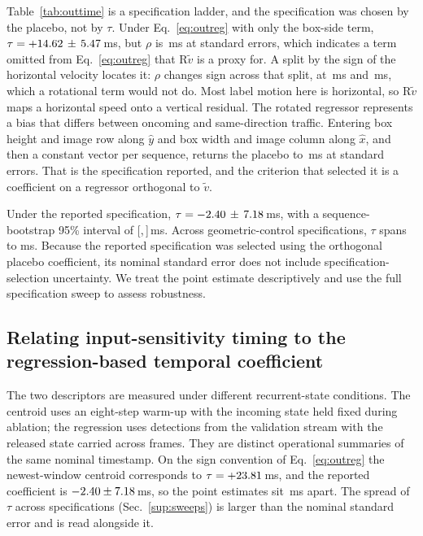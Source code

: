 \documentclass[10pt,twocolumn,letterpaper]{article}
\begin{document}
Table~\ref{tab:outtime} is a specification ladder, and the specification was
chosen by the placebo, not by $\tau$. Under Eq.~\ref{eq:outreg} with only
the box-side term, $\tau=+14.62\,\pm\,5.47$\,ms, but $\rho$ is
\ladderMinPl\,ms at \ladderMinPlSigmas{} standard errors, which indicates a term
omitted from Eq.~\ref{eq:outreg} that $\mathrm{R}\tilde v$ is a proxy for. A split by
the sign of the horizontal velocity locates it: $\rho$ changes sign across that
split, at \plRight\,ms and \plLeft\,ms, which a rotational term would not do.
Most label motion here is horizontal, so $\mathrm{R}\tilde v$ maps a horizontal speed
onto a vertical residual. The rotated regressor represents a bias that differs
between oncoming and same-direction traffic. Entering
box height and image row along $\hat{y}$ and box width and image column along
$\hat{x}$, and then a constant vector per sequence, returns the placebo to
\ladderFullPl\,ms at \ladderFullPlSigmas{} standard errors. That is the
specification reported, and the criterion that selected it is a coefficient on a
regressor orthogonal to $\tilde v$.

Under the reported specification, $\tau=-2.40\,\pm\,7.18$\,ms, with a
sequence-bootstrap 95\% interval of [\outBootLo,\,\outBootHi]\,ms. Across geometric-control
specifications, $\tau$ spans \satLo{} to \satHi{} ms. Because the reported specification was
selected using the orthogonal placebo coefficient, its nominal standard error does not include
specification-selection uncertainty. We treat the point estimate descriptively and use
the full specification sweep to assess robustness.

\subsection{Relating input-sensitivity timing to the regression-based temporal coefficient}
\label{sec:extrapolation}

The two descriptors are measured under different recurrent-state conditions. The centroid uses an eight-step warm-up with the incoming state held fixed during ablation; the regression uses detections from the validation stream with the released state carried across frames. They are distinct operational summaries of the same nominal timestamp. On the sign convention of Eq.~\ref{eq:outreg} the newest-window centroid corresponds to $\tau=+23.81$\,ms, and the reported coefficient is $-2.40\pm7.18$\,ms, so the point estimates sit \outInterval\,ms apart. The spread of $\tau$ across specifications (Sec.~\ref{sup:sweeps}) is larger than the nominal standard error and is read alongside it.
\end{document}
